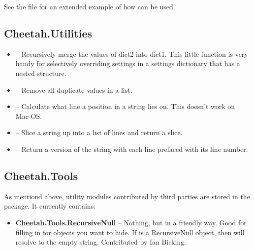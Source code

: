 See the file  for
an extended example of how  can be used.

\subsection{Cheetah.Utilities}
\label{libraries.utilities}

\begin{itemize}
\item {\bf {}} -- Recursively merge
     the values of dict2 into dict1.  This little function is very handy for
     selectively overriding settings in a settings dictionary that has a nested
     structure.
\item {\bf {}} -- Remove all duplicate values in
     a list.
\item {\bf {}} -- Calculate what line a position
     in a string lies on. This doesn't work on Mac-OS.
\item {\bf {}} -- Slice a string up into a list
     of lines and return a slice.
\item {\bf {}} -- Return a version of the string with
     each line prefaced with its line number.
\end{itemize}

\subsection{Cheetah.Tools}
\label{libraries.tools}

As mentiond above, utility modules contributed by third parties are stored in
the  package. It currently contains:

\begin{itemize}
\item {\bf Cheetah.Tools.RecursiveNull} -- Nothing, but in a friendly way.  Good
     for filling in for objects you want to hide.  If  is a
     RecursiveNull object, then  will
     resolve to the empty string. Contributed by Ian Bicking.
\end{itemize}

